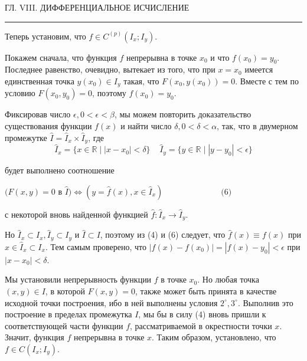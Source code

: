 \documentclass[a4paper, 12pt]{book}
\begin{document}
    \newpage

    \begin{center}
        \begin{spacing}
        
            ГЛ. VIII. ДИФФЕРЕНЦИАЛЬНОЕ ИСЧИСЛЕНИЕ
            \noindent\rule{\textwidth}{1pt}
		\end{spacing}
    \end{center}
    
    \par Теперь установим, что $f \in C^{(p)} (I_x; I_y)$.
    \par Покажем сначала, что функция $f$ непрерывна в точке $x_0$ и что $f(x_0) = y_0$. Последнее равенство, очевидно, вытекает из того, что при $x = x_0$ имеется единственная точка $y(x_0) \in I_y$ такая, что $F(x_0, y(x_0)) = 0$. Вместе с тем по условию $F(x_0, y_0) = 0$, поэтому $f(x_0) = y_0$.
    \par Фиксировав число $\epsilon, 0 < \epsilon < \beta$, мы можем повторить доказательство существования функции $f(x)$ и найти число $\delta, 0 < \delta < \alpha$, так, что в двумерном промежутке $\hat{I} = \hat{I}_x \times \hat{I}_y$, где
    $$\hat{I}_x=\{x \in \mathbb{R} \mid |x - x_0| < \delta \} \;\;\;\;  \hat{I}_y = \{ y \in \mathbb{R} \mid |y - y_0| < \epsilon \}$$
    \par будет выполнено соотношение
    \begin{flushright} 
    $(F(x, y) = 0$ в $\hat{I}) \Leftrightarrow (y = \hat{f}(x), x \in \hat{I}_x)  \quad \quad \quad \quad \quad \quad \quad \textrm{(6)}$
    \end{flushright}
    \par с некоторой вновь найденной функцией $\hat{f} : \hat{I}_x \to \hat{I}_y$.
    \par Но $\hat{I}_x \subset I_x, \hat{I}_y \subset I_y$ и $\hat{I} \subset I$, поэтому из (4) и (6) следует, что $\hat{f}(x) \equiv f(x)$ при $x \in \hat{I}_x \subset I_x$. Тем самым проверено, что $|f(x)-f(x_0)| = |f(x)-y_0| < \epsilon$ при $|x-x_0| < \delta$.
    \par Мы установили непрерывность функции $f$ в точке $x_0$. Но любая точка $(x, y) \in I$, в которой $F(x, y) = 0$, также может быть принята в качестве исходной точки построения, ибо в ней выполнены условия $2^\circ , 3^\circ$. Выполнив это построение в пределах промежутка $I$, мы бы в силу (4) вновь пришли к соответствующей части функции $f$, рассматриваемой в окрестности точки $x$. Значит, функция $f$ непрерывна в точке $x$. Таким образом, установлено, что $f \in C(I_x; I_y)$.
\end{document}
